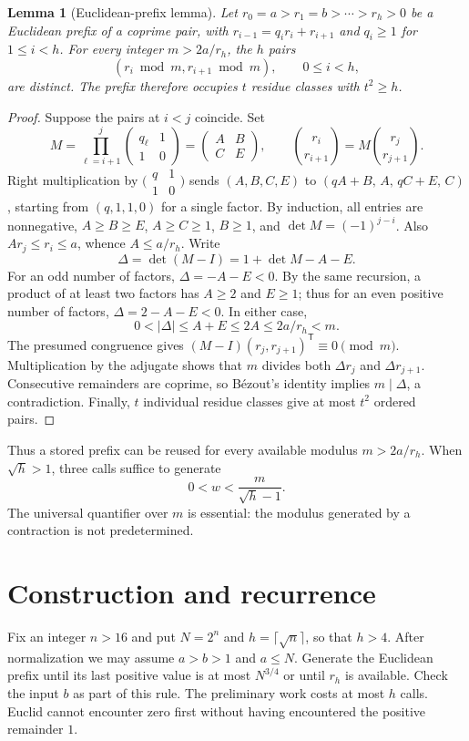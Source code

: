 \documentclass[11pt]{article}
\newtheorem{lemma}[theorem]{Lemma}
\begin{document}
\begin{lemma}[Euclidean-prefix lemma]\label{lem:prefix}
Let $r_0=a>r_1=b>\cdots>r_h>0$ be a Euclidean prefix of a coprime pair, with
$r_{i-1}=q_i r_i+r_{i+1}$ and $q_i\geq1$ for $1\leq i<h$. For every integer
$m>2a/r_h$, the
$h$ pairs
\[
(r_i\bmod m,r_{i+1}\bmod m),\qquad 0\leq i<h,
\]
are distinct. The prefix therefore occupies $t$ residue classes with $t^2\geq h$.
\end{lemma}
\begin{proof}
Suppose the pairs at $i<j$ coincide. Set
\[
M=\prod_{\ell=i+1}^{j}\begin{pmatrix}q_\ell&1\\1&0\end{pmatrix}
 =\begin{pmatrix}A&B\\C&E\end{pmatrix},\qquad
\binom{r_i}{r_{i+1}}=M\binom{r_j}{r_{j+1}}.
\]
Right multiplication by
$\bigl(\begin{smallmatrix}q&1\\1&0\end{smallmatrix}\bigr)$ sends
$(A,B,C,E)$ to $(qA+B,\,A,\,qC+E,\,C)$, starting from $(q,1,1,0)$ for a single
factor. By induction, all entries are nonnegative, $A\geq B\geq E$,
$A\geq C\geq1$, $B\geq1$, and $\det M=(-1)^{j-i}$.
Also $Ar_j\leq r_i\leq a$, whence $A\leq a/r_h$.
Write
\[
\Delta=\det(M-I)=1+\det M-A-E.
\]
For an odd number of factors, $\Delta=-A-E<0$. By the same recursion, a
product of at least two factors has $A\geq2$ and $E\geq1$; thus for an even
positive number of factors,
$\Delta=2-A-E<0$. In either case,
\[
0<|\Delta|\leq A+E\leq2A\leq2a/r_h<m.
\]
The presumed congruence gives $(M-I)(r_j,r_{j+1})^{\mathsf T}\equiv0\pmod m$.
Multiplication by the adjugate shows that $m$ divides both $\Delta r_j$ and
$\Delta r_{j+1}$. Consecutive remainders are coprime, so B\'ezout's identity
implies $m\mid\Delta$, a contradiction. Finally, $t$ individual residue classes
give at most $t^2$ ordered pairs.
\end{proof}
Thus a stored prefix can be reused for every available modulus $m>2a/r_h$.
When $\sqrt h>1$, three calls suffice to generate
\begin{equation}\label{eq:contract}
0<w<\frac{m}{\sqrt h-1}.
\end{equation}
The universal quantifier over $m$ is essential: the modulus generated by a
contraction is not predetermined.

\section{Construction and recurrence}
Fix an integer $n>16$ and put $N=2^n$ and $h=\lceil\sqrt n\rceil$, so that $h>4$.
After normalization we may assume $a>b>1$ and $a\leq N$.
Generate the Euclidean prefix until its last positive value is at most
$N^{3/4}$ or until $r_h$ is available. Check the input $b$ as part of this
rule. The preliminary work costs at most $h$ calls. Euclid cannot encounter
zero first without having encountered the positive remainder $1$.
\end{document}
